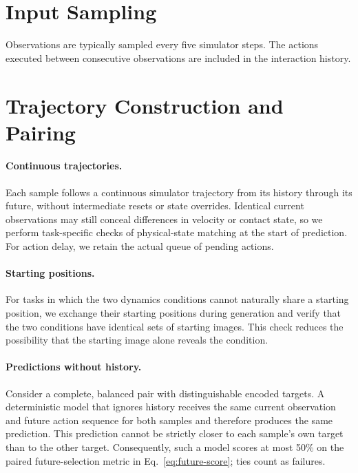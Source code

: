 \section{Input Sampling}
\label{app:input-sampling}

Observations are typically sampled every five simulator steps.
The actions executed between consecutive observations are included in the interaction history.

\section{Trajectory Construction and Pairing}
\label{app:trajectory-pairing}

\paragraph{Continuous trajectories.}
Each sample follows a continuous simulator trajectory from its history through its future, without intermediate resets or state overrides.
Identical current observations may still conceal differences in velocity or contact state, so we perform task-specific checks of physical-state matching at the start of prediction.
For action delay, we retain the actual queue of pending actions.

\paragraph{Starting positions.}
For tasks in which the two dynamics conditions cannot naturally share a starting position, we exchange their starting positions during generation and verify that the two conditions have identical sets of starting images.
This check reduces the possibility that the starting image alone reveals the condition.

\paragraph{Predictions without history.}
Consider a complete, balanced pair with distinguishable encoded targets.
A deterministic model that ignores history receives the same current observation and future action sequence for both samples and therefore produces the same prediction.
This prediction cannot be strictly closer to each sample's own target than to the other target.
Consequently, such a model scores at most 50\% on the paired future-selection metric in Eq.~\ref{eq:future-score}; ties count as failures.

